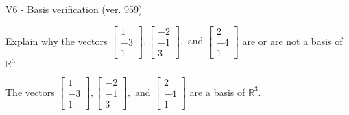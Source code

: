 \begin{exercise}
  \begin{exerciseTitle}V6 - Basis verification (ver. 959)\end{exerciseTitle}
  \begin{exerciseStatement}
    Explain why the vectors \(\left[\begin{array}{r}
1 \\
-3 \\
1
\end{array}\right] , \left[\begin{array}{r}
-2 \\
-1 \\
3
\end{array}\right] , \text{ and } \left[\begin{array}{r}
2 \\
-4 \\
1
\end{array}\right]\) are or are not a basis of \(\mathbb{R}^3\)	


  \end{exerciseStatement}
  \begin{exerciseAnswer}
   The vectors \(\left[\begin{array}{r}
1 \\
-3 \\
1
\end{array}\right] , \left[\begin{array}{r}
-2 \\
-1 \\
3
\end{array}\right] , \text{ and } \left[\begin{array}{r}
2 \\
-4 \\
1
\end{array}\right]\) 
  	 are  a basis of \(\mathbb{R}^3\).
  


  \end{exerciseAnswer}
\end{exercise}
